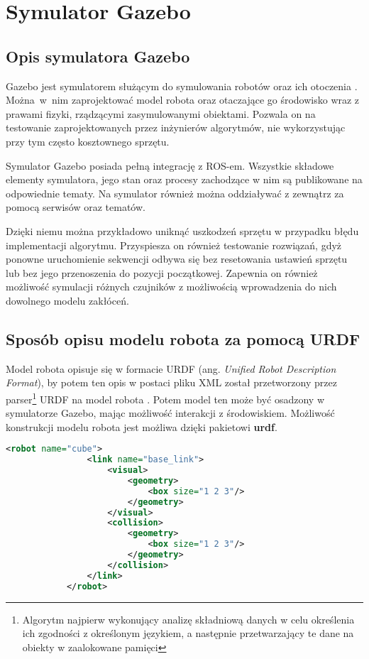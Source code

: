 \newpage
\section{Symulator Gazebo}
{
    \subsection{Opis symulatora Gazebo}
    {
       Gazebo jest symulatorem służącym do symulowania robotów oraz ich otoczenia \cite{gazebo}. Można~w~nim zaprojektować model robota oraz otaczające go środowisko wraz z prawami fizyki, rządzącymi zasymulowanymi obiektami. Pozwala on na testowanie zaprojektowanych przez inżynierów algorytmów, nie wykorzystując przy tym często kosztownego sprzętu. 

       Symulator Gazebo posiada pełną integrację z ROS-em. Wszystkie składowe elementy symulatora, jego stan oraz procesy zachodzące w nim są publikowane na odpowiednie tematy. Na symulator również można oddziaływać z zewnątrz za pomocą serwisów oraz tematów.
       
       Dzięki niemu można przykładowo uniknąć uszkodzeń sprzętu w przypadku błędu implementacji algorytmu. Przyspiesza on również testowanie rozwiązań, gdyż ponowne uruchomienie sekwencji odbywa się bez resetowania ustawień sprzętu lub bez jego przenoszenia do pozycji początkowej. Zapewnia on również możliwość symulacji różnych czujników z możliwością wprowadzenia do nich dowolnego modelu zakłóceń.
    }
    \subsection{Sposób opisu modelu robota za pomocą URDF}
    {
         Model robota opisuje się w formacie URDF (ang. \textit{Unified Robot Description Format}), by potem ten opis w postaci pliku XML został przetworzony przez parser\footnote{Algorytm najpierw wykonujący analizę składniową danych w celu określenia ich zgodności z określonym językiem, a następnie przetwarzający te dane na obiekty w zaalokowane pamięci} URDF na model robota \cite{urdf}. Potem model ten może być osadzony w symulatorze Gazebo, mając możliwość interakcji z środowiskiem. Możliwość konstrukcji modelu robota jest możliwa dzięki pakietowi \textbf{urdf}.

        \vspace{2mm}
         
         \begin{lstlisting}[language=xml, caption=Przykładowy plik URDF z definicją prostego elementu]
            <robot name="cube">
                <link name="base_link">
                    <visual>
                        <geometry>
                            <box size="1 2 3"/>
                        </geometry>
                    </visual>
                    <collision>
                        <geometry>
                            <box size="1 2 3"/>
                        </geometry>
                    </collision>
                </link>
            </robot>
         \end{lstlisting}
    }
    \newpage
}
